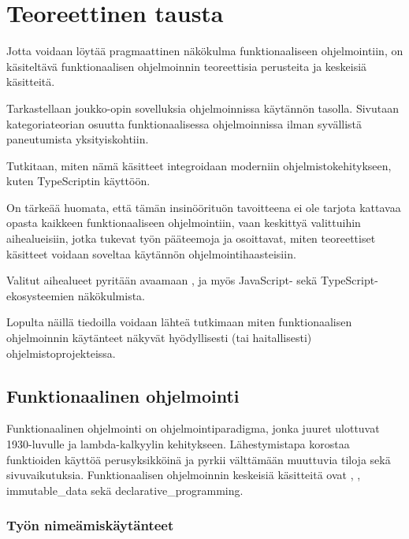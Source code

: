 \vspace{21.5pt}
\chapter{Teoreettinen tausta}

Jotta voidaan löytää pragmaattinen näkökulma funktionaaliseen ohjelmointiin, on käsiteltävä funktionaalisen ohjelmoinnin teoreettisia perusteita ja keskeisiä käsitteitä.

Tarkastellaan joukko-opin sovelluksia ohjelmoinnissa käytännön tasolla. Sivutaan kategoriateorian osuutta funktionaalisessa ohjelmoinnissa ilman syvällistä paneutumista yksityiskohtiin.

Tutkitaan, miten nämä käsitteet integroidaan moderniin ohjelmistokehitykseen, kuten TypeScriptin käyttöön.

On tärkeää huomata, että tämän insinöörituön tavoitteena ei ole tarjota kattavaa opasta kaikkeen funktionaaliseen ohjelmointiin, vaan keskittyä valittuihin aihealueisiin, jotka tukevat työn pääteemoja ja osoittavat, miten teoreettiset käsitteet voidaan soveltaa käytännön ohjelmointihaasteisiin.

Valitut aihealueet pyritään avaamaan , ja myös JavaScript- sekä TypeScript-ekosysteemien näkökulmista.

Lopulta näillä tiedoilla voidaan lähteä tutkimaan miten funktionaalisen ohjelmoinnin käytänteet näkyvät hyödyllisesti (tai haitallisesti) ohjelmistoprojekteissa.

\section{Funktionaalinen ohjelmointi}

Funktionaalinen ohjelmointi on ohjelmointiparadigma, jonka juuret ulottuvat 1930-luvulle ja lambda-kalkyylin kehitykseen. Lähestymistapa korostaa funktioiden käyttöä perusyksikköinä ja pyrkii välttämään muuttuvia tiloja sekä sivuvaikutuksia. Funktionaalisen ohjelmoinnin keskeisiä käsitteitä ovat , , \gls{immutable_data} sekä \gls{declarative_programming}. \citep{Tan2004,computerphile_lambda}

\subsection{Työn nimeämiskäytänteet}


